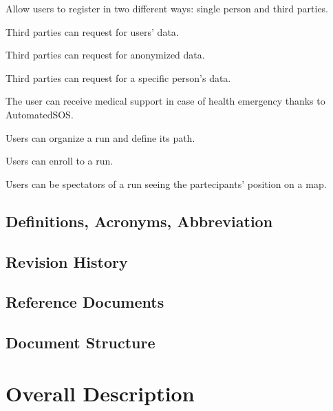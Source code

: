 \documentclass[a4paper]{article}
\begin{document}
\begin{enumerate}[label={[G.\arabic*]}]
	
	
	\item Allow users to register in two different ways: single person and third parties.
	\item Third parties can request for users' data.
	    \begin{enumerate}[label={[G.\arabic*]}]
	        \item Third parties can request for anonymized data.
	        \item Third parties can request for a specific person's data.
	    \end{enumerate}
	
	\item The user can receive medical support in case of health emergency thanks to AutomatedSOS.
	
	\item Users can organize a run and define its path.
	\item Users can enroll to a run.
	\item Users can be spectators of a run seeing the partecipants' position on a map.
	
\end{enumerate}

\subsection{Definitions, Acronyms, Abbreviation}


\subsection{Revision History}

\subsection{Reference Documents}

\subsection{Document Structure}

\section{Overall Description}
\end{document}
